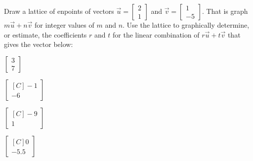 \begin{exercise} Draw a lattice of enpoints of vectors $\vec{u}=\begin{bmatrix}2\\1\end{bmatrix}$ and $\vec{v}=\begin{bmatrix}1\\-5\end{bmatrix}$. That is graph 
$m\vec{u}+n\vec{v}$ for integer values of $m$ and $n$. Use the lattice to graphically determine, or estimate, the coefficients $r$ and $t$ for the linear combination of $r\vec{u}+t\vec{v}$ that gives the vector below:\\
\begin{inparaenum}
\item $\begin{bmatrix}3 \\ 7 \end{bmatrix}$\hfill 
\item $\begin{bmatrix*}[C]-1 \\ -6 \end{bmatrix*}$\hfill {} \\
\item $\begin{bmatrix*}[C]-9 \\ 1 \end{bmatrix*}$\hfill 
\item $\begin{bmatrix*}[C] 0 \\ -5.5 \end{bmatrix*}$\hfill {} \\
\end{inparaenum}
\end{exercise}

